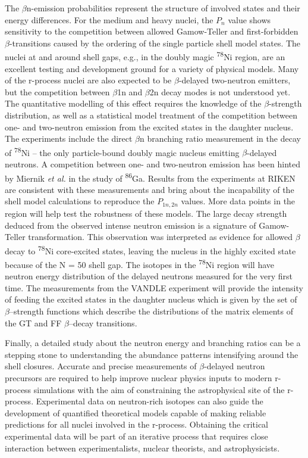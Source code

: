 \documentclass[a4paper,12pt,twoside]{report}
\begin{document}
The $\beta$n-emission probabilities represent the structure of involved states and their energy differences. For the medium and heavy nuclei, the $P_{n}$ value shows sensitivity to the competition between allowed Gamow-Teller and first-forbidden $\beta$-transitions caused by the ordering of the single particle shell model states. The nuclei at and around shell gaps, e.g., in the doubly magic \textsuperscript{78}Ni region, are an excellent testing and development ground for a variety of physical models. Many of the r-process nuclei are also expected to be $\beta$-delayed two-neutron emitters, but the competition between $\beta$1n and $\beta$2n decay modes is not understood yet. The quantitative modelling of this effect requires the knowledge of the $\beta$-strength distribution, as well as a statistical model treatment of the competition between one- and two-neutron emission from the excited states in the daughter nucleus. The experiments include the direct $\beta$n branching ratio measurement in the decay of \textsuperscript{78}Ni – the only particle-bound doubly magic nucleus emitting $\beta$-delayed neutrons. A competition between one- and two-neutron emission has been hinted by Miernik \textit{et al.} \cite{86Ga} in the study of \textsuperscript{86}Ga. Results from the experiments at RIKEN are consistent with these measurements and bring about the incapability of the shell model calculations to reproduce the $P_{1n, 2n}$ values. More data points in the region will help test the robustness of these models. The large decay strength deduced from the observed intense neutron emission is a signature of Gamow-Teller transformation. This observation was interpreted as evidence for allowed $\beta$ decay to \textsuperscript{78}Ni core-excited states, leaving the nucleus in the highly excited state because of the N = 50 shell gap. The isotopes in the \textsuperscript{78}Ni region will have neutron energy distribution of the delayed neutrons measured for the very first time. The measurements from the VANDLE experiment will provide the intensity of feeding the excited states in the daughter nucleus which is given by the set of $\beta$–strength functions which describe the distributions of the matrix elements of the GT and FF $\beta$–decay transitions. 

 Finally, a detailed study about the neutron energy and branching ratios can be a stepping stone to understanding the abundance patterns intensifying around the shell closures. Accurate and precise measurements of $\beta$-delayed neutron precursors are required to help improve nuclear physics inputs to modern r-process simulations with the aim of constraining the astrophysical site of the r-process. Experimental data on neutron-rich isotopes can also guide the development of quantified theoretical models capable of making reliable predictions for all nuclei involved in the r-process. Obtaining the critical experimental data will be part of an iterative process that requires close interaction between experimentalists, nuclear theorists, and astrophysicists.
 
\end{document}
